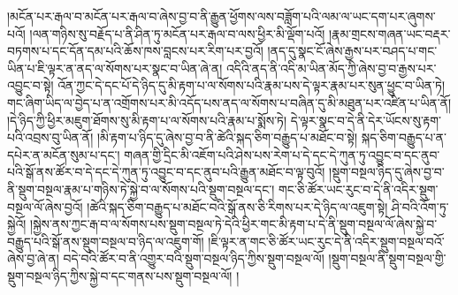 །མངོན་པར་རྒལ་བ་མངོན་པར་རྒལ་བ་ཞེས་བྱ་བ་ནི་རྒྱུན་ཕྱོགས་ལས་བཟློག་པའི་ལམ་ལ་ཡང་དག་པར་ཞུགས་པའོ། །ལན་གཉིས་སུ་བརྗོད་པ་ནི་ཤིན་ཏུ་མངོན་པར་རྒལ་བ་ལས་ཕྱིར་མི་ལྡོག་པའོ། །རྣམ་གྲངས་གཞན་ཡང་བརྡར་བཏགས་པ་དང་དོན་དམ་པའི་ཆོས་ཁས་བླངས་པར་རིག་པར་བྱའོ། །ནད་དུ་སྣང་ངོ་ཞེས་རྒྱས་པར་བཤད་པ་གང་ཡིན་པ་ཇི་ལྟར་ན་ནད་ལ་སོགས་པར་སྣང་བ་ཡིན་ཞེ་ན། འདིའི་ནད་ནི་འདི་མ་ཡིན་མོད་ཀྱི་ཞེས་བྱ་བ་རྒྱས་པར་འབྱུང་བ་སྟེ། འོན་ཀྱང་དེ་དང་པོ་དེ་ཉིད་དུ་མི་རྟག་པ་ལ་སོགས་པའི་རྣམ་པས་དེ་ལྟར་རྣམ་པར་སུན་ཕྱུང་བ་ཡིན་ཏེ། གང་ཞིག་ཡིད་ལ་བྱེད་པ་ན་འགྲོགས་པར་མི་འདོད་པས་ནད་ལ་སོགས་པ་བཞིན་དུ་མི་མཐུན་པར་འཛིན་པ་ཡིན་ནོ། །དེ་ཉིད་ཀྱི་ཕྱིར་མཇུག་ཐོགས་སུ་མི་རྟག་པ་ལ་སོགས་པའི་རྣམ་པ་སྨོས་ཏེ། དེ་ལྟར་སྣང་བ་དེ་ནི་དེར་ཡོངས་སུ་རྟག་པའི་འབྲས་བུ་ཡིན་ནོ། །མི་རྟག་པ་ཉིད་དུ་ཞེས་བྱ་བ་ནི་ཚེའི་སྐད་ཅིག་བརྒྱུད་པ་མཐོང་བ་སྟེ། སྐད་ཅིག་བརྒྱུད་པ་ན་དཔེར་ན་མངོན་སུམ་པ་དང་། གཞན་གྱི་དྲིང་མི་འཇོག་པའི་ཤེས་པས་རེག་པ་དེ་དང་དེ་ཀུན་ཏུ་འབྱུང་བ་དང་ནུབ་པའི་སྒོ་ནས་ཚོར་བ་དེ་དང་དེ་ཀུན་ཏུ་འབྱུང་བ་དང་ནུབ་པའི་རྒྱུན་མཐོང་བ་ལྟ་བུའོ། །སྡུག་བསྔལ་ཉིད་དུ་ཞེས་བྱ་བ་ནི་སྡུག་བསྔལ་རྣམ་པ་གཉིས་ཏེ་སྐྱེ་བ་ལ་སོགས་པའི་སྡུག་བསྔལ་དང་། གང་ཅི་ཚོར་ཡང་རུང་བ་དེ་ནི་འདིར་སྡུག་བསྔལ་ལོ་ཞེས་བྱའོ། །ཚེའི་སྐད་ཅིག་བརྒྱུད་པ་མཐོང་བའི་སྒོ་ནས་ཅི་རིགས་པར་དེ་ཉིད་ལ་འཇུག་སྟེ། ཤི་བའི་འོག་ཏུ་སྐྱེའོ། །སྐྱེས་ནས་ཀྱང་རྒ་བ་ལ་སོགས་པས་སྡུག་བསྔལ་ཏེ་དེའི་ཕྱིར་གང་མི་རྟག་པ་དེ་ནི་སྡུག་བསྔལ་ལོ་ཞེས་སྐྱེ་བ་བརྒྱུད་པའི་སྒོ་ནས་སྡུག་བསྔལ་བ་ཉིད་ལ་འཇུག་གོ། །ཇི་ལྟར་ན་གང་ཅི་ཚོར་ཡང་རུང་དེ་ནི་འདིར་སྡུག་བསྔལ་བའོ་ཞེས་བྱ་ཞེ་ན། བདེ་བའི་ཚོར་བ་ནི་འགྱུར་བའི་སྡུག་བསྔལ་ཉིད་ཀྱིས་སྡུག་བསྔལ་ལོ། །སྡུག་བསྔལ་ནི་སྡུག་བསྔལ་གྱི་སྡུག་བསྔལ་ཉིད་ཀྱིས་སྐྱེ་བ་དང་གནས་པས་སྡུག་བསྔལ་ལོ། །

